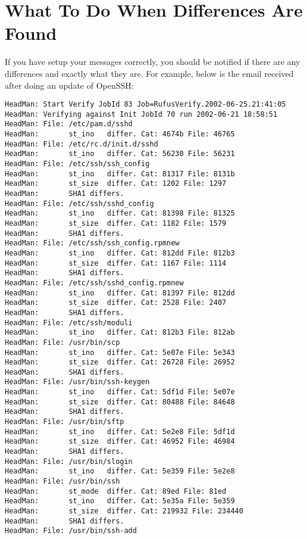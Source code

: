 \section{What To Do When Differences Are Found}

If you have setup your messages correctly, you should be notified if there are
any differences and exactly what they are. For example, below is the email
received after doing an update of OpenSSH: 

\footnotesize
\begin{verbatim}
HeadMan: Start Verify JobId 83 Job=RufusVerify.2002-06-25.21:41:05
HeadMan: Verifying against Init JobId 70 run 2002-06-21 18:58:51
HeadMan: File: /etc/pam.d/sshd
HeadMan:       st_ino   differ. Cat: 4674b File: 46765
HeadMan: File: /etc/rc.d/init.d/sshd
HeadMan:       st_ino   differ. Cat: 56230 File: 56231
HeadMan: File: /etc/ssh/ssh_config
HeadMan:       st_ino   differ. Cat: 81317 File: 8131b
HeadMan:       st_size  differ. Cat: 1202 File: 1297
HeadMan:       SHA1 differs.
HeadMan: File: /etc/ssh/sshd_config
HeadMan:       st_ino   differ. Cat: 81398 File: 81325
HeadMan:       st_size  differ. Cat: 1182 File: 1579
HeadMan:       SHA1 differs.
HeadMan: File: /etc/ssh/ssh_config.rpmnew
HeadMan:       st_ino   differ. Cat: 812dd File: 812b3
HeadMan:       st_size  differ. Cat: 1167 File: 1114
HeadMan:       SHA1 differs.
HeadMan: File: /etc/ssh/sshd_config.rpmnew
HeadMan:       st_ino   differ. Cat: 81397 File: 812dd
HeadMan:       st_size  differ. Cat: 2528 File: 2407
HeadMan:       SHA1 differs.
HeadMan: File: /etc/ssh/moduli
HeadMan:       st_ino   differ. Cat: 812b3 File: 812ab
HeadMan: File: /usr/bin/scp
HeadMan:       st_ino   differ. Cat: 5e07e File: 5e343
HeadMan:       st_size  differ. Cat: 26728 File: 26952
HeadMan:       SHA1 differs.
HeadMan: File: /usr/bin/ssh-keygen
HeadMan:       st_ino   differ. Cat: 5df1d File: 5e07e
HeadMan:       st_size  differ. Cat: 80488 File: 84648
HeadMan:       SHA1 differs.
HeadMan: File: /usr/bin/sftp
HeadMan:       st_ino   differ. Cat: 5e2e8 File: 5df1d
HeadMan:       st_size  differ. Cat: 46952 File: 46984
HeadMan:       SHA1 differs.
HeadMan: File: /usr/bin/slogin
HeadMan:       st_ino   differ. Cat: 5e359 File: 5e2e8
HeadMan: File: /usr/bin/ssh
HeadMan:       st_mode  differ. Cat: 89ed File: 81ed
HeadMan:       st_ino   differ. Cat: 5e35a File: 5e359
HeadMan:       st_size  differ. Cat: 219932 File: 234440
HeadMan:       SHA1 differs.
HeadMan: File: /usr/bin/ssh-add

\end{verbatim}

